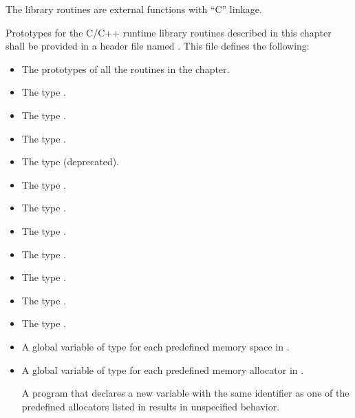 \begin{ccppspecific}
The library routines are external functions with ``C'' linkage.

Prototypes for the C/C++ runtime library routines described in this chapter shall be
provided in a header file named . This file defines the following:

\begin{itemize}
\item The prototypes of all the routines in the chapter.

\item The type .

\item The type .

\item The type .

\item The type  (deprecated).

\item The type .

\item The type .

\item The type .

\item The type .

\item The type .

\item The type .

\item The type .

\item A global variable of type  for each predefined memory space in .

\item A global variable of type  for each predefined memory allocator in .

A program that declares a new variable with the same identifier as one of the predefined allocators listed in  results in unspecified behavior.

\end{itemize}


\end{ccppspecific}

